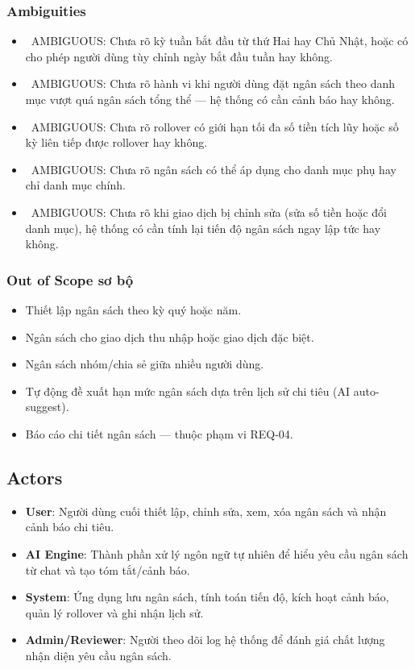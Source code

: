 \subsubsection{Ambiguities}

\begin{itemize}
\item \warningicon\  AMBIGUOUS: Chưa rõ kỳ tuần bắt đầu từ thứ Hai hay Chủ Nhật, hoặc có cho phép người dùng tùy chỉnh ngày bắt đầu tuần hay không.
\item \warningicon\  AMBIGUOUS: Chưa rõ hành vi khi người dùng đặt ngân sách theo danh mục vượt quá ngân sách tổng thể — hệ thống có cần cảnh báo hay không.
\item \warningicon\  AMBIGUOUS: Chưa rõ rollover có giới hạn tối đa số tiền tích lũy hoặc số kỳ liên tiếp được rollover hay không.
\item \warningicon\  AMBIGUOUS: Chưa rõ ngân sách có thể áp dụng cho danh mục phụ hay chỉ danh mục chính.
\item \warningicon\  AMBIGUOUS: Chưa rõ khi giao dịch bị chỉnh sửa (sửa số tiền hoặc đổi danh mục), hệ thống có cần tính lại tiến độ ngân sách ngay lập tức hay không.
\end{itemize}
\subsubsection{Out of Scope sơ bộ}

\begin{itemize}
\item Thiết lập ngân sách theo kỳ quý hoặc năm.
\item Ngân sách cho giao dịch thu nhập hoặc giao dịch đặc biệt.
\item Ngân sách nhóm/chia sẻ giữa nhiều người dùng.
\item Tự động đề xuất hạn mức ngân sách dựa trên lịch sử chi tiêu (AI auto-suggest).
\item Báo cáo chi tiết ngân sách — thuộc phạm vi REQ-04.
\end{itemize}
\subsection{Actors}

\begin{itemize}
\item \textbf{User}: Người dùng cuối thiết lập, chỉnh sửa, xem, xóa ngân sách và nhận cảnh báo chi tiêu.
\item \textbf{AI Engine}: Thành phần xử lý ngôn ngữ tự nhiên để hiểu yêu cầu ngân sách từ chat và tạo tóm tắt/cảnh báo.
\item \textbf{System}: Ứng dụng lưu ngân sách, tính toán tiến độ, kích hoạt cảnh báo, quản lý rollover và ghi nhận lịch sử.
\item \textbf{Admin/Reviewer}: Người theo dõi log hệ thống để đánh giá chất lượng nhận diện yêu cầu ngân sách.
\end{itemize}
